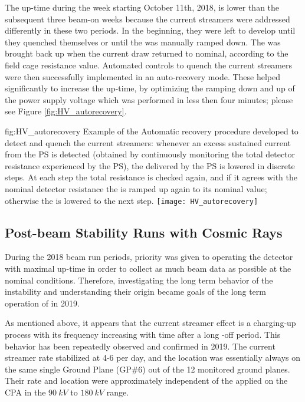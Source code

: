 The up-time during the week starting October 11th, 2018, is lower than the subsequent three beam-on weeks because the current streamers were addressed differently in these two periods. In the beginning, they were left to develop until they quenched themselves or until the  was manually ramped down. The  was brought back up when the current draw returned to nominal, according to the field cage resistance value. Automated controls to quench the current streamers were then successfully implemented in an auto-recovery mode. These helped significantly to increase the up-time, by optimizing the ramping down and up of the  power supply voltage which was performed in less then four minutes; please see Figure \ref{fig:HV_autorecovery}.

\begin{dunefigure}
{fig:HV_autorecovery}
{Example of the  Automatic recovery procedure developed to detect and quench the current streamers: whenever an excess sustained current from the  PS is detected (obtained by continuously monitoring the total detector resistance experienced by the PS), the  delivered by the PS is lowered in discrete steps. At each step the total resistance is checked again, and if it agrees with the nominal detector resistance the  is ramped up again to its nominal value; otherwise the  is lowered to the next step.}
\texttt{[image: HV\_autorecovery]}
\end{dunefigure}



\subsection{Post-beam Stability Runs with Cosmic Rays}
\label{sec:fdsp-hv-long-term-operation}

During the 2018 beam run periods, priority was given to operating the  detector with maximal up-time in order to collect as much beam data as possible at the nominal  conditions. Therefore, investigating the long term behavior of the  instability and understanding their origin became goals of the long term operation of  in 2019.


As mentioned above, it appears that the current streamer effect is a charging-up process with its frequency increasing with time after a long -off period. This behavior has been repeatedly observed and confirmed in 2019. The current streamer rate stabilized at 4-6 per day, and the location was essentially always on the same single Ground Plane (GP\#6) out of the 12 monitored ground planes. Their rate and location were approximately independent of the  applied on the CPA in the $\SI{90}{kV}$ to $\SI{180}{kV}$ range.



